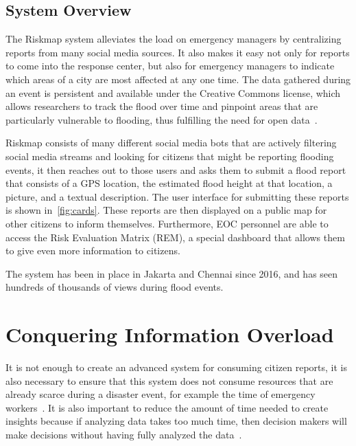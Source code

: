 	\subsection{System Overview} The Riskmap system alleviates the load on
	emergency managers by centralizing reports from many social media
	sources. It also makes it easy not only for reports to come into the
	response center, but also for emergency managers to indicate which areas
	of a city are most affected at any one time. The data gathered during an
	event is persistent and available under the Creative Commons license,
	which allows researchers to track the flood over time and pinpoint areas
	that are particularly vulnerable to flooding, thus fulfilling the need
	for open data~\cite{holdernessSocialMediaGeoSocial2015a}.

	Riskmap consists of many different social media bots that are actively
	filtering social media streams and looking for citizens that might be
	reporting flooding events, it then reaches out to those users and asks
	them to submit a flood report that consists of a GPS location, the
	estimated flood height at that location, a picture, and a textual
	description. The user interface for submitting these reports is shown
	in~\ref{fig:cards}. These reports are then displayed on a public map for other
	citizens to inform themselves. Furthermore, EOC personnel are able to
	access the Risk Evaluation Matrix (REM), a special dashboard that allows
	them to give even more information to citizens.

	The system has been in place in Jakarta and Chennai since 2016, and has
	seen hundreds of thousands of views during flood events.


\section{Conquering Information Overload} It is not enough to create an advanced
system for consuming citizen reports, it is also necessary to ensure that this
system does not consume resources that are already scarce during a disaster
event, for example the time of emergency
workers~\cite{aminDataNaturalDisasters2008}. It is also important to reduce the
amount of time needed to create insights because if analyzing data takes too
much time, then decision makers will make decisions without having fully
analyzed the data~\cite{quarantelliUrbanVulnerabilityDisasters2003}.


